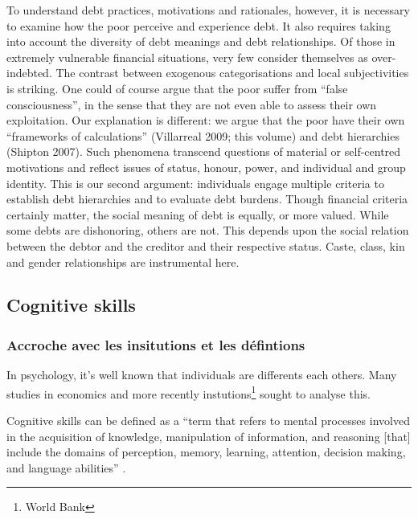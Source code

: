 \documentclass[a4paper, 11pt, onecolumn]{article}
\begin{document}
To understand debt practices, motivations and rationales, however, it is necessary to examine
how the poor perceive and experience debt. It also requires taking into account the diversity
of debt meanings and debt relationships. Of those in extremely vulnerable financial situations,
very few consider themselves as over-indebted. The contrast between exogenous
categorisations and local subjectivities is striking. One could of course argue that the poor
suffer from “false consciousness”, in the sense that they are not even able to assess their own
exploitation. Our explanation is different: we argue that the poor have their own “frameworks
of calculations” (Villarreal 2009; this volume) and debt hierarchies (Shipton 2007). Such
phenomena transcend questions of material or self-centred motivations and reflect issues of
status, honour, power, and individual and group identity. This is our second argument:
individuals engage multiple criteria to establish debt hierarchies and to evaluate debt burdens.
Though financial criteria certainly matter, the social meaning of debt is equally, or more
valued. While some debts are dishonoring, others are not. This depends upon the social
relation between the debtor and the creditor and their respective status. Caste, class, kin and
gender relationships are instrumental here.








	\subsection{Cognitive skills}

		\subsubsection{Accroche avec les insitutions et les défintions}

In psychology, it's well known that individuals are differents each others.
Many studies in economics and more recently instutions\footnote{World Bank} sought to analyse this.	
	
Cognitive skills can be defined as a ``term that refers to mental processes involved in the acquisition of knowledge, manipulation of information, and reasoning [that] include the domains of perception, memory, learning, attention, decision making, and language abilities'' \citep{Kiely2014}.
\end{document}
